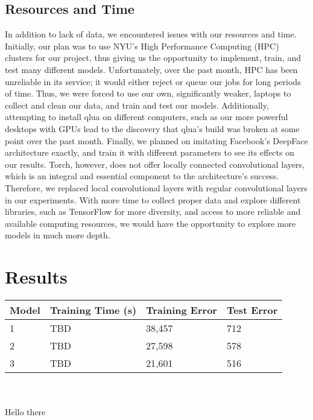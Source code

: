 \documentclass[11pt]{article}
\begin{document}
    \subsection{Resources and Time}
	\par
	In addition to lack of data, we encountered issues with our resources and time. Initially, our plan was to use NYU's High Performance Computing (HPC) clusters for our project, thus giving us the opportunity to implement, train, and test many different models. Unfortunately, over the past month, HPC has been unreliable in its service; it would either reject or queue our jobs for long periods of time. Thus, we were forced to use our own, significantly weaker, laptops to collect and clean our data, and train and test our models. Additionally, attempting to install qlua on different computers, such as our more powerful desktops with GPUs lead to the discovery that qlua's build was  broken at some point over the past month. Finally, we planned on imitating Facebook's DeepFace architecture exactly, and train it with different parameters to see its effects on our results. Torch, however, does not offer locally connected convolutional layers, which is an integral and essential component to the architecture's success. Therefore, we replaced local convolutional layers with regular convolutional layers in our experiments. With more time to collect proper data and explore different libraries, such as TensorFlow for more diversity, and access to more reliable and available computing resources, we would have the opportunity to explore more models in much more depth. 
\section{Results} 



\hskip-1.2cm
\begin{tabular}{ |p{3.5cm}||p{3.5cm}|p{3cm}|p{3cm}|  }
 \hline
 \hline
 Model & Training Time (s) & Training Error & Test Error \\ [1.0ex] 
 \hline\hline
 1 & TBD & 38,457 & 712 \\ 
 \hline
 2 & TBD  & 27,598 & 578 \\
 \hline
 3 & TBD & 21,601 & 516 \\
 \hline

\end{tabular}
\\
\\

Hello there
\end{document}
